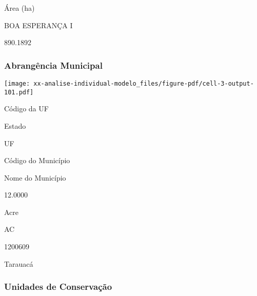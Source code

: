 \documentclass[
  11pt,
  a4paper,
  DIV=11,
  numbers=noendperiod]{scrartcl}
\begin{document}
Área (ha)

\n    

\n  

\n  

\n    

\n      

BOA ESPERANÇA I

\n      

890.1892

\n    

\n  

\n

\subsubsection{Abrangência Municipal}\label{abranguxeancia-municipal-5}

\texttt{[image: xx-analise-individual-modelo\_files/figure-pdf/cell-3-output-101.pdf]}

\n  

\n    

\n      

Código da UF

\n      

Estado

\n      

UF

\n      

Código do Município

\n      

Nome do Município

\n    

\n  

\n  

\n    

\n      

12.0000

\n      

Acre

\n      

AC

\n      

1200609

\n      

Tarauacá

\n    

\n  

\n

\subsubsection{Unidades de
Conservação}\label{unidades-de-conservauxe7uxe3o-5}
\end{document}
